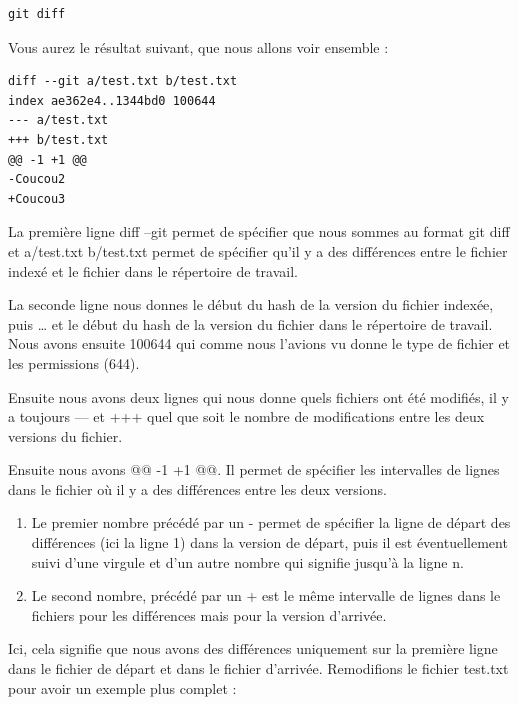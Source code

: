 \documentclass{article}
\begin{document}
\begin{verbatim}
git diff
\end{verbatim}

Vous aurez le résultat suivant, que nous allons voir ensemble :
\begin{verbatim}
diff --git a/test.txt b/test.txt
index ae362e4..1344bd0 100644
--- a/test.txt
+++ b/test.txt
@@ -1 +1 @@
-Coucou2
+Coucou3
\end{verbatim}

La première ligne {\color{blue}diff --git} permet de spécifier que nous sommes au format {\color{blue}git diff} et {\color{blue}a/test.txt} {\color{blue}b/test.txt} permet de spécifier qu'il y a des différences entre le fichier indexé et le fichier dans le répertoire de travail.

La seconde ligne nous donnes le début du {\color{blue}hash} de la version du fichier indexée, puis {\color{blue}…} et le début du {\color{blue}hash} de la version du fichier dans le répertoire de travail. Nous avons ensuite {\color{blue}100644} qui comme nous l'avions vu donne le type de fichier et les permissions ({\color{blue}644}).

Ensuite nous avons deux lignes qui nous donne quels fichiers ont été modifiés, il y a toujours {\color{blue}---} et {\color{blue}+++} quel que soit le nombre de modifications entre les deux versions du fichier.

Ensuite nous avons {\color{blue}@@ -1 +1 @@}. Il permet de spécifier les intervalles de lignes dans le fichier où il y a des différences entre les deux versions.
\begin{enumerate}
\item Le premier nombre précédé par un {\color{blue}-} permet de spécifier la ligne de départ des différences (ici la ligne 1) dans la version de départ, puis il est éventuellement suivi d'une virgule et d'un autre nombre qui signifie jusqu'à la ligne n.

\item Le second nombre, précédé par un {\color{blue}+} est le même intervalle de lignes dans le fichiers pour les différences mais pour la version d'arrivée.
\end{enumerate}

Ici, cela signifie que nous avons des différences uniquement sur la première ligne dans le fichier de départ et dans le fichier d'arrivée. Remodifions le fichier test.txt pour avoir un exemple plus complet :
\end{document}
